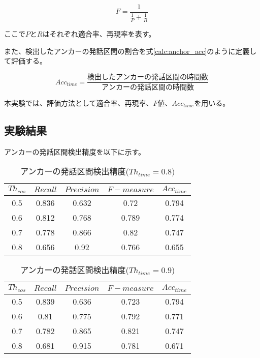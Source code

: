 \begin{equation}
\label{calc:fmeasure2}
F = \frac{1}{\frac{1}{P} + \frac{1}{R}}
\end{equation}

ここで$P$と$R$はそれぞれ適合率、再現率を表す。

また、検出したアンカーの発話区間の割合を式\ref{calc:anchor_acc}のように定義して評価する。

\begin{equation}
\label{calc:anchor_acc}
Acc_{time} = \frac{検出したアンカーの発話区間の時間数}{アンカーの発話区間の時間数}
\end{equation}

本実験では、評価方法として適合率、再現率、$F$値、$Acc_{time}$を用いる。

\subsection{実験結果}
アンカーの発話区間検出精度を以下に示す。

\begin{table}[H]
  \begin{center}
    \caption{アンカーの発話区間検出精度($Th_{time}=0.8)$ \label{table:result_get_anchor08}}
    \begin{tabular}{|c||c|c|c|c|} \hline
      $Th_{cos}$ & $Recall$ & $Precision$ & $F-measure$ & $Acc_{time}$\\ \hline
0.5 & 0.836 & 0.632 & 0.72 & 0.794 \\ \hline
0.6 & 0.812 & 0.768 & 0.789 & 0.774 \\ \hline
0.7 & 0.778 & 0.866 & 0.82 & 0.747 \\ \hline
0.8 & 0.656 & 0.92 & 0.766 & 0.655 \\ \hline

    \end{tabular}
  \end{center}
\end{table}

\begin{table}[H]
  \begin{center}
    \caption{アンカーの発話区間検出精度($Th_{time}=0.9$) \label{table:result_get_anchor09}}
    \begin{tabular}{|c||c|c|c|c|} \hline
      $Th_{cos}$ & $Recall$ & $Precision$ & $F-measure$ & $Acc_{time}$\\ \hline
0.5 & 0.839 & 0.636 & 0.723 & 0.794 \\ \hline
0.6 & 0.81 & 0.775 & 0.792 & 0.771 \\ \hline
0.7 & 0.782 & 0.865 & 0.821 & 0.747 \\ \hline
0.8 & 0.681 & 0.915 & 0.781 & 0.671 \\ \hline

    \end{tabular}
  \end{center}
\end{table}

